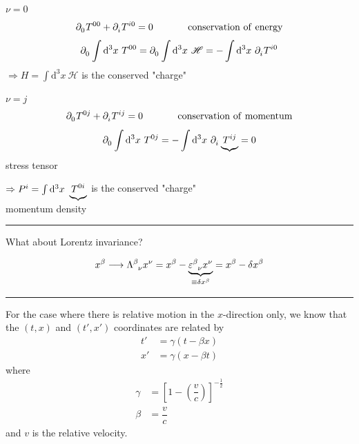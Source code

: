 \documentclass{article}
\begin{document}
\noindent \underline{$\nu = 0$}
\begin{equation*}
    \tensor{\partial}{_0} \tensor{T}{^0^0} + \tensor{\partial}{_i} \tensor{T}{^i^0} = 0 \hspace{0.5in} \mathrm{conservation} ~ \mathrm{of} ~ \mathrm{energy}
\end{equation*}
\begin{equation*}
    \tensor{\partial}{_0} \int \mathrm{d}^3 x~ \tensor{T}{^0^0} = \tensor{\partial}{_0} \int \mathrm{d}^3 x~ \mathscr{H} = - \int \mathrm{d}^3 x~ \tensor{\partial}{_i} \tensor{T}{^i^0}
\end{equation*}
$\Rightarrow H = \int \mathrm{d}^3 x~ \mathscr{H}$ is the conserved "charge"

\noindent \underline{$\nu = j$}
\begin{equation*}
    \tensor{\partial}{_0} \tensor{T}{^0^j} + \tensor{\partial}{_i} \tensor{T}{^i^j} = 0 \hspace{0.5in} \mathrm{conservation} ~ \mathrm{of} ~ \mathrm{momentum}
\end{equation*}
\begin{equation*}
    \tensor{\partial}{_0} \int \mathrm{d}^3 x~ \tensor{T}{^0^j} =  - \int \mathrm{d}^3 x~ \tensor{\partial}{_i} \underbrace{ \tensor{T}{^i^j} } = 0
\end{equation*}
\hspace*{2.7in} {\small stress tensor}

$\Rightarrow \tensor{P}{^i} = \int \mathrm{d}^3 x~ \underbrace{ \tensor{T}{^0^i} }$ is the conserved "charge"
\\ \hspace*{0.75in} {\small momentum density}

\noindent\rule{\textwidth}{.5pt}


\noindent What about Lorentz invariance?

\begin{equation*}
    \tensor{x}{^\beta} \longrightarrow \tensor{\Lambda}{^\beta _\nu} \tensor{x}{^\nu} = \tensor{x}{^\beta} - \underbrace{ \tensor{\varepsilon}{^\beta _\nu} \tensor{x}{^\nu} }_{ \equiv \delta \tensor{x}{^\beta} } = \tensor{x}{^\beta} - \delta \tensor{x}{^\beta}
\end{equation*}

\noindent\rule{\textwidth}{.5pt}

\noindent For the case where there is relative motion in the $x$-direction only, we know that the $(t, x)$ and $(t', x')$ coordinates are related by
\begin{align*}
    t' &= \gamma ( t - \beta x ) \\
    x' &= \gamma ( x - \beta t )
\end{align*}
where
\begin{align*}
    \gamma &= {[ 1 - \left( \dfrac{v}{c} \right) ]}^{ -\frac{1}{2} } \\
    \beta &= \dfrac{v}{c}
\end{align*}
and $v$ is the relative velocity.
\end{document}
